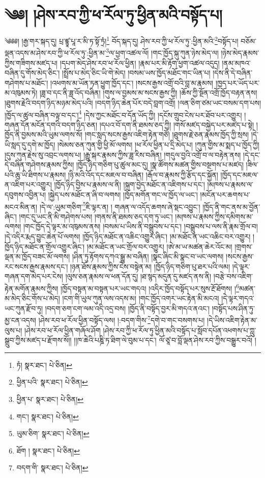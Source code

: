 \setcounter{footnote}{0} 
\chapter{༄༅། །ཤེས་རབ་ཀྱི་ཕ་རོལ་ཏུ་ཕྱིན་མའི་བསྟོད་པ།}༄༅༅། །རྒྱ་གར་སྐད་དུ། པྲ་ཛྙཱ་པཱ་ར་མི་ཏ་སྟོ་ཏྲཾ།\footnote{ཏཾ།  སྣར་ཐང་།  པེ་ཅིན། } བོད་སྐད་དུ། ཤེས་རབ་ཀྱི་ཕ་རོལ་ཏུ་:ཕྱིན་མའི་\footnote{ཕྱིན་པའི་  སྣར་ཐང་།  པེ་ཅིན། }བསྟོད་པ། བཅོམ་ལྡན་འདས་མ་ཤེས་རབ་ཀྱི་ཕ་རོལ་ཏུ་:ཕྱིན་མ་\footnote{ཕྱིན་པ་  སྣར་ཐང་།  པེ་ཅིན། }ལ་ཕྱག་འཚལ་ལོ། །གང་ཁྱོད་སྐུ་ཀུན་ཉེས་མེད་ལ། །ཉེས་མེད་རྣམས་ཀྱིས་གཟིགས་མཛད་པ། །དཔག་མེད་ཤེས་རབ་ཕ་རོལ་ཕྱིན། །རྣམ་པར་མི་རྟོག་ཕྱག་འཚལ་འདུད། །ནམ་མཁའ་བཞིན་དུ་གོས་མེད་ཅིང་། །སྤྲོས་པ་མེད་ཅིང་ཡི་གེ་མེད། །བསམ་ཡས་ཁྱོད་མཐོང་གང་ཡིན་པ། །དེས་ནི་དེ་བཞིན་གཤེགས་པ་མཐོང་། །འཕགས་མ་ཡོན་ཏན་ཕྱུག་ཁྱོད་དང་། །སངས་རྒྱས་འགྲོ་བའི་བླ་མ་རྣམས། །ཁྱད་པར་ཡོད་པར་མ་འཁུམས་ཏེ། །ཟླ་བ་དང་ནི་ཟླ་འོད་བཞིན། །གུས་ལ་བྱམས་མ་སངས་རྒྱས་ཀྱི། །ཆོས་ཀྱི་སྔོན་འགྲོ་ཁྱོད་བརྟན་ནས། །ཐུགས་རྗེའི་བདག་ཉིད་མཉམ་མེད་པའི། །བདག་ཉིད་ཆེན་པོར་བདེ་བླག་འགྲོ། །ལན་ཅིག་ཙམ་ཡང་བསམ་དག་པས། །ཁྱོད་ལ་ཚུལ་བཞིན་བལྟ་བ་དང་།\footnote{གང་།  སྣར་ཐང་།  པེ་ཅིན། } །དེས་ཀྱང་མཐོང་བ་དོན་ཡོད་ཀྱི། །དངོས་གྲུབ་ངེས་པར་ཐོབ་པར་འགྱུར། །གཞན་དོན་མངོན་དགའི་བདག་ཉིད་ཅན། །དཔའ་བོ་དག་ནི་ཐམས་ཅད་ཀྱི། །གསོ་མཛད་བསྐྱེད་པར་མཛད་པ་སྟེ། །ཁྱོད་ནི་བྱམས་མའི་ཡུམ་ལགས་སོ། །གང་སླད་སངས་རྒྱས་འཇིག་རྟེན་གཙོ། །ཐུགས་རྗེ་ཅན་རྣམས་ཁྱོད་ཀྱི་སྲས། །དེ་ཡི་སླད་དུ་དགེ་མ་ཁྱོད། །སེམས་ཅན་ཀུན་གྱི་ཕྱི་མོ་ལགས། །ཕ་རོལ་ཕྱིན་པ་དྲི་མེད་པ། །ཀུན་གྱིས་མ་སྨད་པ་ཁྱོད་ཀྱི། །དུས་ཀུན་རྗེས་སུ་འབྲང་ལགས་པ། །རྒྱུ་སྐར་རྣམས་ཀྱིས་ཟླ་རིས་བཞིན། །གདུལ་བྱའི་འགྲོ་བ་ལ་བརྟེན་ནས། །དེ་དང་དེ་བཞིན་གཤེགས་རྣམས་ཀྱིས། །ཁྱོད་ཉིད་གཅིག་པུ་ཚུལ་མང་དུ། །སྣ་ཚོགས་མཚན་གྱིས་བསྔགས་པ་མཛད། །ཟིལ་པའི་ཆུ་ཡི་ཐིགས་པ་རྣམས། །ཉི་མའི་འོད་དང་མཇལ་བ་བཞིན། །རྒོལ་བ་རྣམས་ཀྱི་རྩོད་དང་སྐྱོན། །ཁྱོད་དང་མཇལ་ན་འཇིག་པར་འགྱུར། །ཁྱོད་ཉིད་བྱིས་པ་རྣམས་ལ་ནི། །སྐྲག་བྱེད་མཐོང་ན་འཇིགས་པ་དང་། །མཁས་པ་རྣམས་ལ་དབུགས་འབྱིན་པ། །སྐྱེད་པས་མཐོང་ན་ཞི་བ་ལགས། །ཁྱོད་མགོན་གང་ལ་ཁྱོད་ལ་ཡང་། །མངོན་པར་ཆགས་པ་མངའ་མིན་ན། །དེ་ལ་:ཡུམ་གཅིག་\footnote{ཡུམ་ཅིག་  སྣར་ཐང་།  པེ་ཅིན། }ཇི་ལྟར་ན། །
གཞན་ལ་འདོད་ཆགས་ཞེ་སྡང་འབྱུང་། །ཁྱོད་ནི་གང་ནས་མ་བྱོན་ཞིང་། །གང་དུ་ཡང་ནི་མི་གཤེགས་པས། །གནས་ནི་ཐམས་ཅད་དག་ཏུ་ཡང་། །མཁས་པ་རྣམས་ཀྱིས་དམིགས་མ་ལགས། །གང་ཁྱོད་དེ་ལྟར་མ་འཁུམས་ནས། །བསམ་པ་ཡིས་ནི་བསྒྲུབས་པ་དང་། །བསྒྲུབས་པ་ལས་ནི་རྣམ་གྲོལ་བ། །དེ་འདིར་རྨད་བྱུང་ཆེན་པོ་ལགས། །ཁྱོད་ཉིད་མཐོང་ན་འཆིང་འགྱུར་ཞིང་། །མ་མཐོང་ན་ཡང་འཆིང་བར་འགྱུར། །ཁྱོད་ཉིད་མཐོང་ན་གྲོལ་འགྱུར་ཞིང་། །མ་མཐོང་ན་ཡང་གྲོལ་བར་འགྱུར། །ཨེ་མ་ཡ་མཚན་ཆེར་འོང་མ། །གྲགས་ལྡན་མ་ཁྱོད་བཟང་མོ་ལགས། །ཤིན་ཏུ་རྟོགས་དཀའ་སྒྱུ་མ་བཞིན། །སྣང་ཞིང་མི་སྣང་བ་ཡང་ལགས། །སངས་རྒྱས་རང་སངས་རྒྱས་རྣམས་དང་། །ཉན་ཐོས་རྣམས་ཀྱིས་ངེས་བསྟེན་མ། །ཁྱོད་ཉིད་གཅིག་པུ་ཐར་པའི་ལམ། །དེ་ལྟར་གཞན་དག་མེད་པར་ངེས། །ལུས་ཅན་རྣམས་ལ་ཕན་དོན་དུ། །ཐ་སྙད་མདུན་དུ་མཛད་ནས་ནི། །བརྩེ་བས་འཇིག་རྟེན་མགོན་རྣམས་ཀྱིས། །ཁྱོད་བསྟན་མ་བསྟན་པར་ཡང་གདའ། །འདིར་ཁྱོད་བསྟོད་པར་སུས་རྔོ་ཐོགས། །\footnote{ཐོག །  སྣར་ཐང་།  པེ་ཅིན། }མཚན་མ་མེད་ཅིང་གོས་པ་མེད། །ངག་གི་ཡུལ་ཀུན་ལས་འདས་མ། །གང་ཁྱོད་འགར་ཡང་རྟེན་མི་མངའ། །དེ་ལྟར་གདའ་ཡང་ཀུན་རྫོབ་ཏུ། །བདག་ཅག་ངག་ལམ་འདི་འདྲ་བས། །ཁྱོད་ནི་བསྟོད་བྱར་མི་གདའ་ནའང་། །བསྟོད་པས་ཤིན་ཏུ་མྱ་ངན་འདས། །ཤེས་རབ་ཕ་རོལ་ཕྱིན་བསྟོད་ལས། །:བདག་གིས་\footnote{བདག་གི་  སྣར་ཐང་།  པེ་ཅིན། }དགེ་བ་གང་བསགས་པ། །དེ་ཡིས་འཇིག་རྟེན་མ་ལུས་པ། །ཤེས་རབ་ཕ་རོལ་ཕྱིན་གཞོལ་ཤོག །ཤེས་རབ་ཀྱི་ཕ་རོལ་ཏུ་ཕྱིན་མའི་བསྟོད་པ་སློབ་དཔོན་འཕགས་པ་ཀླུ་སྒྲུབ་ཀྱིས་མཛད་པ་རྫོགས་སོ།། །།ཁ་ཆེའི་པཎྜི་ཏ་ཐིག་ལེ་བུམ་པ་དང་། ལོ་ཙཱ་བ་བློ་ལྡན་ཤེས་རབ་ཀྱིས་བསྒྱུར་བའོ། ། 